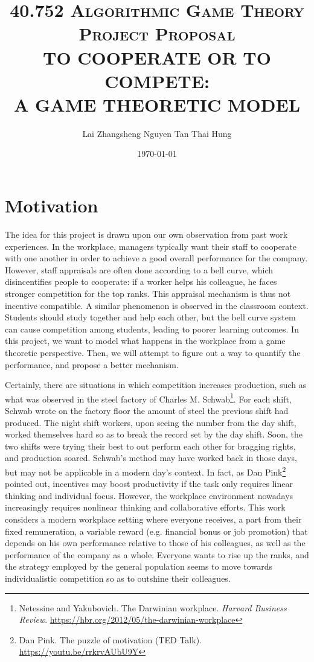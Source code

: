 \documentclass[11pt, a4paper]{article}
\title{
	\vspace*{-1.5cm}
	\scshape 40.752 Algorithmic Game Theory\\
	\vspace{0.5cm}
	Project Proposal\\
	\vspace{0.5cm}
	{\bfseries\Large TO COOPERATE OR TO COMPETE: \\
		A GAME THEORETIC MODEL}\\
	\vspace{0.5cm}}
\author{Lai Zhangsheng \qquad \qquad Nguyen Tan Thai Hung}
\date{\today}
\begin{document}
	
	\maketitle
	
	
	\section{Motivation}
	The idea for this project is drawn upon our own observation from past work experiences. In the workplace, managers typically want their staff to cooperate with one another in order to achieve a good overall performance for the company. However, staff appraisals are often done according to a bell curve, which disincentifies people to cooperate: if a worker helps his colleague, he faces stronger competition for the top ranks. This appraisal mechanism is thus not incentive compatible. A similar phenomenon is observed in the classroom context. Students should study together and help each other, but the bell curve system can cause competition among students, leading to poorer learning outcomes. In this project, we want to model what happens in the workplace from a game theoretic perspective. Then, we will attempt to figure out a way to quantify the performance, and propose a better mechanism. 
	
	Certainly, there are situations in which competition increases production, such as what was observed in the steel factory of Charles M. Schwab\footnote{Netessine and Yakubovich. The Darwinian workplace. \textit{Harvard Business Review}. \url{https://hbr.org/2012/05/the-darwinian-workplace}}. For each shift, Schwab wrote on the factory floor the amount of steel the previous shift had produced. The night shift workers, upon seeing the number from the day shift, worked themselves hard so as to break the record set by the day shift. Soon, the two shifts were trying their best to out perform each other for bragging rights, and production soared. Schwab's method may have worked back in those days, but may not be applicable in a modern day's context. In fact, as Dan Pink\footnote{Dan Pink. The puzzle of motivation (TED Talk). \url{https://youtu.be/rrkrvAUbU9Y}} pointed out, incentives may boost productivity if the task only requires linear thinking and individual focus. However, the workplace environment nowadays increasingly requires nonlinear thinking and collaborative efforts. This work considers a modern workplace setting where everyone receives, a part from their fixed remuneration, a variable reward (e.g. financial bonus or job promotion) that depends on his own performance relative to those of his colleagues, as well as the performance of the company as a whole. Everyone wants to rise up the ranks, and the strategy employed by the general population seems to move towards individualistic competition so as to outshine their colleagues.
	
\end{document}
